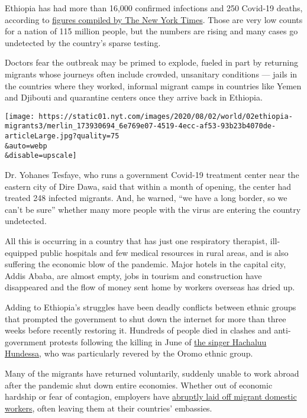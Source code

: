 Ethiopia has had more than 16,000 confirmed infections and 250 Covid-19
deaths, according to
\href{https://www.nytimes.com/interactive/2020/world/coronavirus-maps.html\#countries}{figures
compiled by The New York Times}. Those are very low counts for a nation
of 115 million people, but the numbers are rising and many cases go
undetected by the country's sparse testing.

Doctors fear the outbreak may be primed to explode, fueled in part by
returning migrants whose journeys often include crowded, unsanitary
conditions --- jails in the countries where they worked, informal
migrant camps in countries like Yemen and Djibouti and quarantine
centers once they arrive back in Ethiopia.

\texttt{[image: https://static01.nyt.com/images/2020/08/02/world/02ethiopia-migrants3/merlin\_173930694\_6e769e07-4519-4ecc-af53-93b23b4070de-articleLarge.jpg?quality=75\\\&auto=webp\\\&disable=upscale]}

Dr. Yohanes Tesfaye, who runs a government Covid-19 treatment center
near the eastern city of Dire Dawa, said that within a month of opening,
the center had treated 248 infected migrants. And, he warned, ``we have
a long border, so we can't be sure'' whether many more people with the
virus are entering the country undetected.

All this is occurring in a country that has just one respiratory
therapist, ill-equipped public hospitals and few medical resources in
rural areas, and is also suffering the economic blow of the pandemic.
Major hotels in the capital city, Addis Ababa, are almost empty, jobs in
tourism and construction have disappeared and the flow of money sent
home by workers overseas has dried up.

Adding to Ethiopia's struggles have been deadly conflicts between ethnic
groups that prompted the government to shut down the internet for more
than three weeks before recently restoring it. Hundreds of people died
in clashes and anti-government protests following the killing in June of
\href{https://www.nytimes.com/2020/07/11/world/africa/ethiopia-hachalu-hundessa.html}{the
singer Hachaluu Hundessa}, who was particularly revered by the Oromo
ethnic group.

Many of the migrants have returned voluntarily, suddenly unable to work
abroad after the pandemic shut down entire economies. Whether out of
economic hardship or fear of contagion, employers have
\href{https://www.nytimes.com/2020/07/06/world/middleeast/coronavirus-saudi-domestic-workers-maids-arab.html}{abruptly
laid off migrant domestic workers}, often leaving them at their
countries' embassies.

